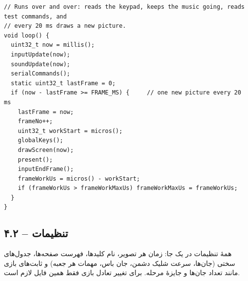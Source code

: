 \documentclass[11pt,a4paper]{article}
\begin{document}
\begin{latin}
\begin{lstlisting}[language=Arduino]
// Runs over and over: reads the keypad, keeps the music going, reads test commands, and
// every 20 ms draws a new picture.
void loop() {
  uint32_t now = millis();
  inputUpdate(now);
  soundUpdate(now);
  serialCommands();
  static uint32_t lastFrame = 0;
  if (now - lastFrame >= FRAME_MS) {     // one new picture every 20 ms
    lastFrame = now;
    frameNo++;
    uint32_t workStart = micros();
    globalKeys();
    drawScreen(now);
    present();
    inputEndFrame();
    frameWorkUs = micros() - workStart;
    if (frameWorkUs > frameWorkMaxUs) frameWorkMaxUs = frameWorkUs;
  }
}
\end{lstlisting}

\end{latin}

\clearpage
\subsection*{۴.۲  – تنظیمات}
همهٔ تنظیمات در یک جا: زمان هر تصویر، نام کلیدها، فهرست صفحه‌ها، جدول‌های سختی (جان‌ها، سرعت شلیک دشمن، جان باس، مهمات هر جعبه) و ثابت‌های بازی مانند تعداد جان‌ها و جایزهٔ مرحله. برای تغییر تعادل بازی فقط همین فایل لازم است.
\end{document}
